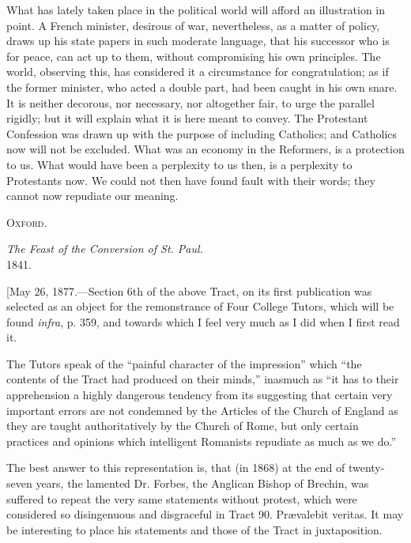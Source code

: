 What has lately taken place in the political world will afford an
illustration in point. A French minister, desirous of war,
nevertheless, as a matter of policy, draws up his state papers in such
moderate language, that his successor who is for peace, can act up to
them, without compromising his own principles. The world, observing
this, has considered it a circumstance for congratulation; as if the
former minister, who acted a double part, had been caught in his own
snare. It is neither decorous, nor necessary, nor altogether fair, to
urge the parallel rigidly; but it will explain what it is here meant
to convey. The Protestant Confession was drawn up with the
purpose of including Catholics; and Catholics now will not be
excluded. What was an economy in the Reformers, is a protection to us.
What would have been a perplexity to us then, is a perplexity to
Protestants now. We could not then have found fault with their words;
they cannot now repudiate our meaning.

O\textsc{xford}.

\emph{The Feast of the Conversion of St. Paul.}\\
1841.


[May 26, 1877.—Section 6th of the above Tract, on its first
publication was selected as an object for the remonstrance of Four
College Tutors, which will be found \emph{infra}, p. 359, and towards
which I feel very much as I did when I first read it.

The Tutors speak of the ``painful character of the
impression'' which ``the contents of the Tract had produced on
their minds,'' inasmuch as ``it has to their apprehension a
highly dangerous tendency from its suggesting that certain very
important errors are not condemned by the Articles of the Church of
England as they are taught authoritatively by the Church of Rome, but
only certain practices and opinions which intelligent Romanists
repudiate as much as we do.''

The best answer to this representation is, that (in 1868) at the
end of twenty-seven years, the lamented Dr. Forbes, the Anglican
Bishop of Brechin, was suffered to repeat the very same statements
without protest, which were considered so disingenuous and disgraceful
in Tract 90. Prævalebit veritas. It may be interesting to place his
statements and those of the Tract in juxtaposition.


